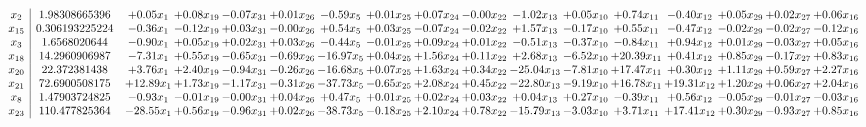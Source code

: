 \documentclass[9pt]{article}
\begin{document}
\[\begin{array}{c| c c@{\hskip 2pt} c@{\hskip 2pt} c@{\hskip 2pt} c@{\hskip 2pt} c@{\hskip 2pt} c@{\hskip 2pt} c@{\hskip 2pt} c@{\hskip 2pt} c@{\hskip 2pt} c@{\hskip 2pt} c@{\hskip 2pt} c@{\hskip 2pt} c@{\hskip 2pt} c@{\hskip 2pt} c@{\hskip 2pt} }
 x_{2}   &  1.98308665396 & +  0.05 x_{1} & +  0.08 x_{19} & -0.07 x_{31} & +  0.01 x_{26} & -0.59 x_{5} & +  0.01 x_{25} & +  0.07 x_{24} & -0.00 x_{22} & -1.02 x_{13} & +  0.05 x_{10} & +  0.74 x_{11} & -0.40 x_{12} & +  0.05 x_{29} & +  0.02 x_{27} & +  0.06 x_{16}\\
 x_{15}   &  0.306193225224 & -0.36 x_{1} & -0.12 x_{19} & +  0.03 x_{31} & -0.00 x_{26} & +  0.54 x_{5} & +  0.03 x_{25} & -0.07 x_{24} & -0.02 x_{22} & +  1.57 x_{13} & -0.17 x_{10} & +  0.55 x_{11} & -0.47 x_{12} & -0.02 x_{29} & -0.02 x_{27} & -0.12 x_{16}\\
 x_{3}   &  1.6568020644 & -0.90 x_{1} & +  0.05 x_{19} & +  0.02 x_{31} & +  0.03 x_{26} & -0.44 x_{5} & -0.01 x_{25} & +  0.09 x_{24} & +  0.01 x_{22} & -0.51 x_{13} & -0.37 x_{10} & -0.84 x_{11} & +  0.94 x_{12} & +  0.01 x_{29} & -0.03 x_{27} & +  0.05 x_{16}\\
 x_{18}   &  14.2960906987 & -7.31 x_{1} & +  0.55 x_{19} & -0.65 x_{31} & -0.69 x_{26} & -16.97 x_{5} & +  0.04 x_{25} & +  1.56 x_{24} & +  0.11 x_{22} & +  2.68 x_{13} & -6.52 x_{10} & + 20.39 x_{11} & +  0.41 x_{12} & +  0.85 x_{29} & -0.17 x_{27} & +  0.83 x_{16}\\
 x_{20}   &  22.372381438 & +  3.76 x_{1} & +  2.40 x_{19} & -0.94 x_{31} & -0.26 x_{26} & -16.68 x_{5} & +  0.07 x_{25} & +  1.63 x_{24} & +  0.34 x_{22} & -25.04 x_{13} & -7.81 x_{10} & + 17.47 x_{11} & +  0.30 x_{12} & +  1.11 x_{29} & +  0.59 x_{27} & +  2.27 x_{16}\\
 x_{21}   &  72.6900508175 & + 12.89 x_{1} & +  1.73 x_{19} & -1.17 x_{31} & -0.31 x_{26} & -37.73 x_{5} & -0.65 x_{25} & +  2.08 x_{24} & +  0.45 x_{22} & -22.80 x_{13} & -9.19 x_{10} & + 16.78 x_{11} & + 19.31 x_{12} & +  1.20 x_{29} & +  0.06 x_{27} & +  2.04 x_{16}\\
 x_{8}   &  1.47903724825 & -0.93 x_{1} & -0.01 x_{19} & -0.00 x_{31} & +  0.04 x_{26} & +  0.47 x_{5} & +  0.01 x_{25} & +  0.02 x_{24} & +  0.03 x_{22} & +  0.04 x_{13} & +  0.27 x_{10} & -0.39 x_{11} & +  0.56 x_{12} & -0.05 x_{29} & -0.01 x_{27} & -0.03 x_{16}\\
 x_{23}   &  110.477825364 & -28.55 x_{1} & +  0.56 x_{19} & -0.96 x_{31} & +  0.02 x_{26} & -38.73 x_{5} & -0.18 x_{25} & +  2.10 x_{24} & +  0.78 x_{22} & -15.79 x_{13} & -3.03 x_{10} & +  3.71 x_{11} & + 17.41 x_{12} & +  0.30 x_{29} & -0.93 x_{27} & +  0.85 x_{16}\\

\end{array}\]
\end{document}
